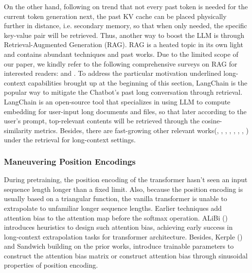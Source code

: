 \noindent On the other hand, following on trend that not every past token is needed for the current token generation next, the past KV cache can be placed physically further in distance, i.e. secondary memory, so that when only needed, the specific key-value pair will be retrieved. Thus, another way to boost the LLM is through Retrieval-Augmented Generation (RAG). RAG is a heated topic in its own light and contains abundant techniques and past works. Due to the limited scope of our paper, we kindly refer to the following comprehensive surveys on RAG for interested readers: \cite{gao2023retrieval} and \cite{zhao2024retrieval}. To address the particular motivation underlined long-context capabilities brought up at the beginning of this section, LangChain \cite{pandya2023automating} is the popular way to mitigate the Chatbot's past long conversation through retrieval. LangChain is an open-source tool that specializes in using LLM to compute embedding for user-input long documents and files, so that later according to the user's prompt, top-relevant contents will be retrieved through the cosine-similarity metrics. Besides, there are fast-growing other relevant works(\cite{borgeaud2021improving}, \cite{bertsch2024unlimiformer}, \cite{zhong2023memorybank}, \cite{zhou2023recurrentgpt}, \cite{kynoch2023recallm}, \cite{modarressi2023retllm}, \cite{guu2020retrieval}, \cite{wang2024augmenting}) under the retrieval for long-context settings. 

\subsubsection{Maneuvering Position Encodings} 
During pretraining, the position encoding of the transformer hasn't seen an input sequence length longer than a fixed limit. Also, because the position encoding is usually based on a triangular function, the vanilla transformer is unable to extrapolate to unfamiliar longer sequence lengths. Earlier techniques add attention bias to the attention map before the softmax operation. ALiBi (\cite{press2021train}) introduces heuristics to design such attention bias, achieving early success in long-context extrapolation tasks for transformer architecture. Besides, Kerple (\cite{chi2022kerple}) and Sandwich building on the prior works, introduce trainable parameters to construct the attention bias matrix or construct attention bias through sinusoidal properties of position encoding. \\ 

